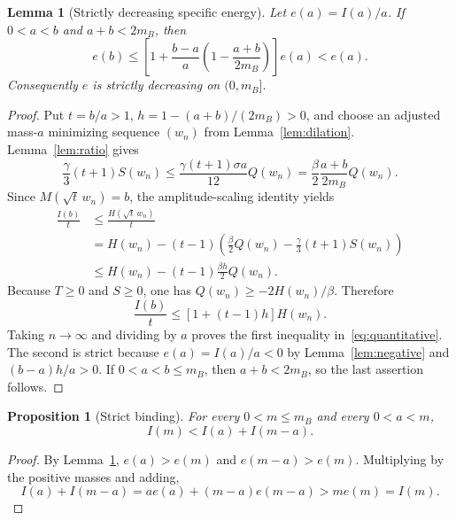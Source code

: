 \documentclass[11pt]{article}
\newtheorem{lemma}[theorem]{Lemma}
\newtheorem{proposition}[theorem]{Proposition}
\begin{document}
\begin{lemma}[Strictly decreasing specific energy]\label{lem:e}
Let \(e(a)=I(a)/a\). If \(0<a<b\) and \(a+b<2m_B\), then
\begin{equation}\label{eq:quantitative}
e(b)\le\left[1+\frac{b-a}{a}
\left(1-\frac{a+b}{2m_B}\right)\right]e(a)<e(a).
\end{equation}
Consequently \(e\) is strictly decreasing on \((0,m_B]\).
\end{lemma}
\begin{proof}
Put \(t=b/a>1\), \(h=1-(a+b)/(2m_B)>0\), and choose
an adjusted mass-\(a\) minimizing sequence \((w_n)\) from
Lemma~\ref{lem:dilation}. Lemma~\ref{lem:ratio} gives
\[
\frac\gamma3(t+1)S(w_n)
\le\frac{\gamma(t+1)\sigma a}{12}Q(w_n)
=\frac\beta2\frac{a+b}{2m_B}Q(w_n).
\]
Since \(M(\sqrt t\,w_n)=b\), the amplitude-scaling identity yields
\begin{align*}
\frac{I(b)}t&\le\frac{H(\sqrt t\,w_n)}t\\
&=H(w_n)-(t-1)\left(\frac\beta2Q(w_n)
-\frac\gamma3(t+1)S(w_n)\right)\\
&\le H(w_n)-(t-1)\frac{\beta h}{2}Q(w_n).
\end{align*}
Because \(T\ge0\) and \(S\ge0\), one has
\(Q(w_n)\ge-2H(w_n)/\beta\). Therefore
\[
\frac{I(b)}t\le[1+(t-1)h]H(w_n).
\]
Taking \(n\to\infty\) and dividing by \(a\) proves the first
inequality in~\eqref{eq:quantitative}. The second is strict because
\(e(a)=I(a)/a<0\) by Lemma~\ref{lem:negative} and
\((b-a)h/a>0\). If \(0<a<b\le m_B\), then
\(a+b<2m_B\), so the last assertion follows.
\end{proof}

\begin{proposition}[Strict binding]\label{prop:binding}
For every \(0<m\le m_B\) and every \(0<a<m\),
\[
I(m)<I(a)+I(m-a).
\]
\end{proposition}
\begin{proof}
By Lemma~\ref{lem:e}, \(e(a)>e(m)\) and
\(e(m-a)>e(m)\). Multiplying by the positive masses and adding,
\[
I(a)+I(m-a)=ae(a)+(m-a)e(m-a)>me(m)=I(m).
\]
\end{proof}
\end{document}
